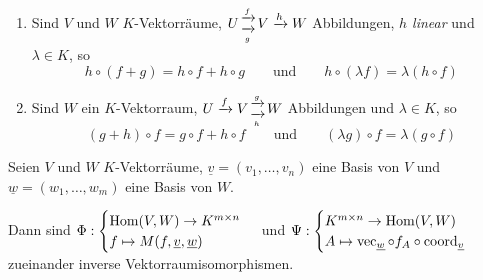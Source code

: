 \documentclass[../../main.tex]{subfiles}
\begin{document}
\begin{exo}\label{7.1.7}
\begin{enumerate}[\normalfont(a)]
\item Sind $V$ und $W$ $K$-Vektorräume, $U\over{\xrightarrow{f}}{\xrightarrow[g]{}} V \xrightarrow{h}W$ Abbildungen, \emph{$h$ linear} und $\lambda\in K$, so
$$h\circ (f+g) = h\circ f+h\circ g\qquad \text{und} \qquad h\circ (\lambda f) = \lambda(h\circ f)$$
\item Sind $W$ ein $K$-Vektorraum, $U\xrightarrow{f}V\over{\xrightarrow{g}}{\xrightarrow[h]{}}W$ Abbildungen und $\lambda\in K$, so
$$(g+h)\circ f = g\circ f +h\circ f \qquad\text{und}\qquad (\lambda g)\circ f = \lambda(g\circ f)$$
\end{enumerate}
\end{exo}

\begin{sat}\label{7.1.8}
Seien $V$ und $W$ $K$-Vektorräume, $\underline{v} = (v_1,\ldots,v_n)$ eine Basis von $V$ und $\underline{w} = (w_1,\ldots,w_m)$ eine Basis von $W$.

Dann sind $\Phi : \begin{cases}
\operatorname{Hom}(V,W) \to K^{m\times n}\\
f\mapsto M(f,\underline{v},\underline{w})
\end{cases}$ und $\Psi : \begin{cases}
K^{m\times n} \to \operatorname{Hom}(V,W)\\
A\mapsto \operatorname{vec}_{\underline{w}} \circ f_A \circ \operatorname{coord}_{\underline{v}}
\end{cases}$ zueinander inverse Vektorraumisomorphismen.
\end{sat}
\end{document}
